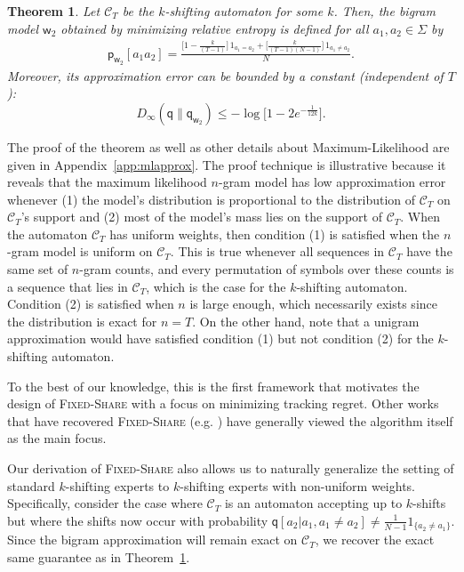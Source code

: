 \documentclass{article}
\newcommand{\sC}{\mathscr C}
\newcommand{\sfp}{{\mathsf p}}
\newcommand{\sfq}{{\mathsf q}}
\newcommand{\sfw}{{\mathsf w}}
\newtheorem{theorem}{Theorem}
\begin{document}
\begin{theorem}
\label{th:bigramkshift}
Let $\sC_T$ be the $k$-shifting automaton for some $k$.  Then, the
bigram model $\sfw_2$ obtained by minimizing relative entropy is
defined for all $a_1, a_2 \in \Sigma$ by
\begin{align*}
\sfp_{\sfw_2}[a_1a_2]
\! = \! \frac{\big[ 1 - \frac{k}{(T - 1)}\big] \, 1_{a_1  = a_2} 
+ \big[ \frac{k}{(T - 1)(N - 1)} \big] \, 1_{a_1 \neq a_2}}{N} .
\end{align*}
Moreover, its approximation error can be bounded by a constant
(independent of $T$):
\begin{equation*}
    D_\infty(\sfq \| \sfq_{\sfw_2}) \leq  - \log \big[ 1 - 2e^{-\frac{1}{12k}} \big].
\end{equation*}
\end{theorem}
The proof of the theorem as well as other details about
Maximum-Likelihood are given in Appendix~\ref{app:mlapprox}.
The proof technique is illustrative
because it reveals that the maximum likelihood $n$-gram model has low
approximation error whenever (1) the model's distribution is
proportional to the distribution of $\sC_T$ on $\sC_T$'s support and
(2) most of the model's mass lies on the support of $\sC_T$. When the
automaton $\sC_T$ has uniform weights, then condition (1) is satisfied
when the $n$-gram model is uniform on $\sC_T$. This is true whenever
all sequences in $\sC_T$ have the same set of $n$-gram counts, and
every permutation of symbols over these counts is a sequence that lies
in $\sC_T$, which is the case for the $k$-shifting
automaton. Condition (2) is satisfied when $n$ is large enough, which
necessarily exists since the distribution is exact for $n = T$. On the
other hand, note that a unigram approximation would have satisfied
condition (1) but not condition (2) for the $k$-shifting automaton.

To the best of our knowledge, this is the first framework that
motivates the design of \textsc{Fixed-Share} with a focus on
minimizing tracking regret. Other works that have recovered
\textsc{Fixed-Share} (e.g. \citep{CesaBianchiGaillardLugosiStoltz2012,
  KoolenDeRooij2013, GyorgySzepesvari2016}) have generally viewed the
algorithm itself as the main focus.

Our derivation of \textsc{Fixed-Share} also allows us to naturally
generalize the setting of standard $k$-shifting experts to
$k$-shifting experts with non-uniform weights. Specifically, consider
the case where $\sC_T$ is an automaton accepting up to $k$-shifts but
where the shifts now occur with probability
$\sfq[a_2 | a_1, a_1 \neq a_2] \neq \frac{1}{N-1} 1_{\{a_2 \neq
  a_1\}}$.  Since the bigram approximation will remain exact on
$\sC_T$, we recover the exact same guarantee as in
Theorem~\ref{th:bigramkshift}.
\end{document}
